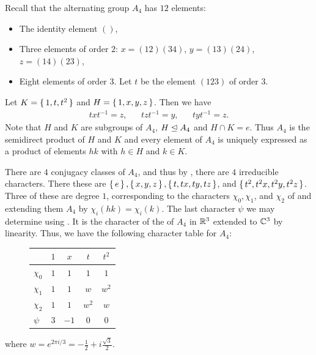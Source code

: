 \documentclass[letterpaper, 11pt, oneside]{book}
\begin{document}
\begin{ex}\label{ex:char_table_A4}
  Recall that the alternating group $A_{4}$ has $12$ elements:
  \begin{itemize}
  \item The identity element $()$,
  \item Three elements of order $2$: $x = (12)(34)$, $y = (13)(24)$, $z = (14)(23)$,
  \item Eight elements of order $3$.
        Let $t$ be the element $(123)$ of order $3$.
  \end{itemize}
  Let $K = \set{1, t, t^{2}}$ and $H = \set{1, x, y, z}$.
  Then we have
  \begin{align*}
    txt^{-1} = z, && tzt^{-1} = y, && tyt^{-1} = z.
  \end{align*}
  Note that $H$ and $K$ are subgroups of $A_{4}$, $H \trianglelefteq A_{4}$ and $H \cap K = e$.
  Thus $A_{4}$ is the semidirect product of $H$ and $K$ and every element of $A_{4}$ is uniquely expressed as a product of elements $hk$ with $h \in H$ and $k \in K$.

  There are $4$ conjugacy classes of $A_{4}$, and thus by , there are $4$ irreducible characters.
  There these are $\set{e}, \set{x, y, z}, \set{t, tx, ty, tz}$, and $\set{t^{2}, t^{2}x, t^{2}y, t^{2}z}$.
  Three of these are degree $1$, corresponding to the characters $\chi_{0}, \chi_{1}$, and $\chi_{2}$ of  and extending them $A_{4}$ by $\chi_{i}(hk) = \chi_{i}(k)$.
  The last character $\psi$ we may determine using .
  It is the character of the  of $A_{4}$ in $\mathbb{R}^{3}$ extended to $\mathbb{C}^{3}$ by linearity.
  Thus, we have the following character table for $A_{4}$:
  \begin{figure}[h]
    \centering
    \begin{tabular}{l|cccc}
      & $1$ & $x$ & $t$ & $t^{2}$ \\\hline
      $\chi_{0}$ & $1$ & $1$ & $1$ & $1$ \\
      $\chi_{1}$ & $1$ & $1$ & $w$ & $w^{2}$ \\
      $\chi_{2}$ & $1$ & $1$ & $w^{2}$ & $w$ \\
      $\psi$ & $3$ & $-1$ & $0$ & $0$
    \end{tabular}
  \end{figure}
  where $w = e^{2 \pi i / 3} = -\frac{1}{2} + i \frac{\sqrt{3}}{2}$.
\end{ex}
\end{document}
